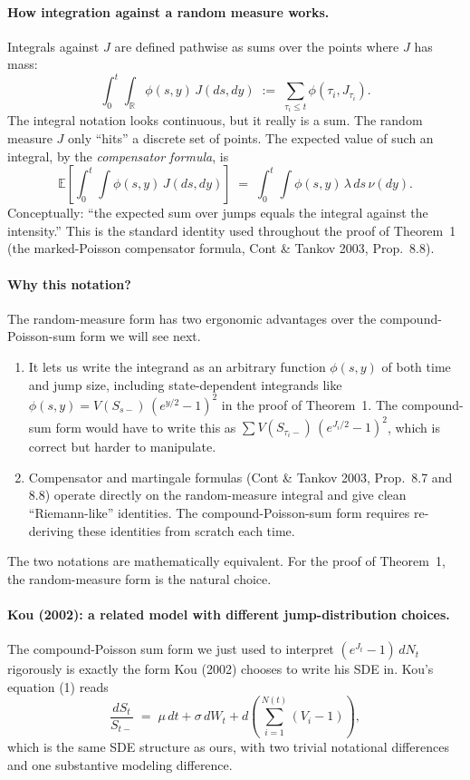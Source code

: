 \documentclass[11pt]{article}
\theoremstyle{definition}
\theoremstyle{remark}
\newcommand{\E}{\mathbb{E}}
\newcommand{\1}{\mathbf{1}}
\begin{document}
\paragraph{How integration against a random measure works.}
Integrals against $J$ are defined pathwise as sums over the points where $J$ has mass:
\[
\int_0^t \int_{\mathbb{R}} \phi(s, y)\,J(ds, dy) \;:=\; \sum_{\tau_i \le t} \phi(\tau_i, J_{\tau_i}).
\]
The integral notation looks continuous, but it really is a sum. The random measure $J$ only ``hits'' a discrete set of points. The expected value of such an integral, by the \emph{compensator formula}, is
\[
\E\!\left[\int_0^t\!\int \phi(s, y)\,J(ds, dy)\right] \;=\; \int_0^t \!\int \phi(s, y)\,\lambda\,ds\,\nu(dy).
\]
Conceptually: ``the expected sum over jumps equals the integral against the intensity.'' This is the standard identity used throughout the proof of Theorem~1 (the marked-Poisson compensator formula, Cont \& Tankov 2003, Prop.~8.8).

\paragraph{Why this notation?}
The random-measure form has two ergonomic advantages over the compound-Poisson-sum form we will see next.
\begin{enumerate}[leftmargin=2em]
\item It lets us write the integrand as an arbitrary function $\phi(s, y)$ of both time and jump size, including state-dependent integrands like $\phi(s, y) = V(S_{s-})\,(e^{y/2} - 1)^2$ in the proof of Theorem~1. The compound-sum form would have to write this as $\sum V(S_{\tau_i-})\,(e^{J_i/2} - 1)^2$, which is correct but harder to manipulate.
\item Compensator and martingale formulas (Cont \& Tankov 2003, Prop.~8.7 and 8.8) operate directly on the random-measure integral and give clean ``Riemann-like'' identities. The compound-Poisson-sum form requires re-deriving these identities from scratch each time.
\end{enumerate}
The two notations are mathematically equivalent. For the proof of Theorem~1, the random-measure form is the natural choice.

\paragraph{Kou (2002): a related model with different jump-distribution choices.}
The compound-Poisson sum form we just used to interpret $(e^{J_t} - 1)\,dN_t$ rigorously is exactly the form Kou (2002) chooses to write his SDE in. Kou's equation (1) reads
\begin{equation}\label{eq:kou-sde}
\frac{dS_t}{S_{t-}} \;=\; \mu\,dt + \sigma\,dW_t + d\!\left(\sum_{i=1}^{N(t)} (V_i - 1)\right),
\end{equation}
which is the same SDE structure as ours, with two trivial notational differences and one substantive modeling difference.
\end{document}
